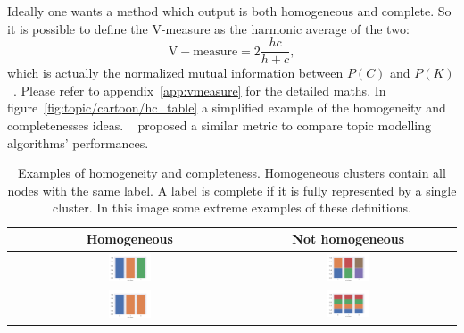 Ideally one wants a method which output is both homogeneous and complete. So it is possible to define the V-measure as the harmonic average of the two:
\begin{equation}\label{eq:mutualinformation}
    \mathrm{V-measure}=2\frac{h c}{h + c},
\end{equation}
which is actually the normalized mutual information between $P(C)$ and $P(K)$~\cite{rosenberg2007v}. Please refer to appendix~\ref{app:vmeasure} for the detailed maths. In figure~\ref{fig:topic/cartoon/hc_table} a simplified example of the homogeneity and completenesses ideas. ~\cite{Shi} proposed a similar metric to compare topic modelling algorithms' performances.
\begin{table}[htb!]
	\centering
	\begin{tabular}{|c|c|c|}
		\hline
		&Homogeneous & Not homogeneous\\ \hline
		\rotatebox[origin=l]{90}{Complete}&    \includegraphics[width=0.2\textwidth]{pictures/topic/cartoon/cartoon_hc.pdf}&\includegraphics[width=0.2\textwidth]{pictures/topic/cartoon/cartoon_c.pdf}  \\ \hline
		\rotatebox{90}{Not complete}&   \includegraphics[width=0.2\textwidth]{pictures/topic/cartoon/cartoon_h.pdf}&\includegraphics[width=0.2\textwidth]{pictures/topic/cartoon/cartoon.pdf} \\ \hline
	\end{tabular}
	\caption{Examples of homogeneity and completeness. Homogeneous clusters contain all nodes with the same label. A label is complete if it is fully represented by a single cluster. In this image some extreme examples of these definitions.}
	\label{tab:topic/cartoon/hc_table}
\end{table}
			
